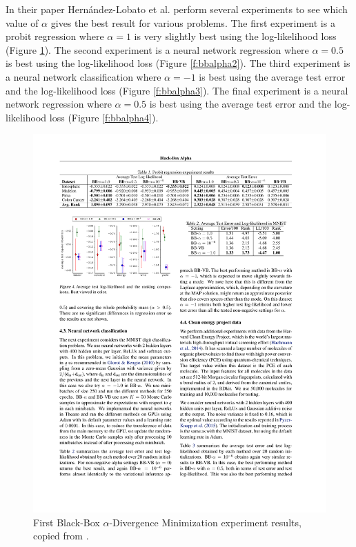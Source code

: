 \documentclass[12pt,vu]{adammath}
\theoremstyle{plain}
\theoremstyle{definition}
\theoremstyle{remark}
\begin{document}
In their paper \cite{bbalpha} Hernández-Lobato et al. perform several experiments to see which value of $\alpha$ gives the best result for various problems.
The first experiment is a probit regression where $\alpha = 1$ is very slightly best using the log-likelihood loss (Figure \ref{f:bbalpha}).
The second experiment is a neural network regression where $\alpha = 0.5$ is best using the log-likelihood loss (Figure \ref{f:bbalpha2}).
The third experiment is a neural network classification where $\alpha = -1$ is best using the average test error and the log-likelihood loss (Figure \ref{f:bbalpha3}).
The final experiment is a neural network regression where $\alpha = 0.5$ is best using the average test error and the log-likelihood loss (Figure \ref{f:bbalpha4}).

\begin{figure}[p]\label{f:bbalpha}
  \centering\includegraphics{figures/from-bb-alpha.pdf}
  \caption{First Black-Box $\alpha$-Divergence Minimization experiment results, copied from \cite{bbalpha}.}
\end{figure}
\end{document}
